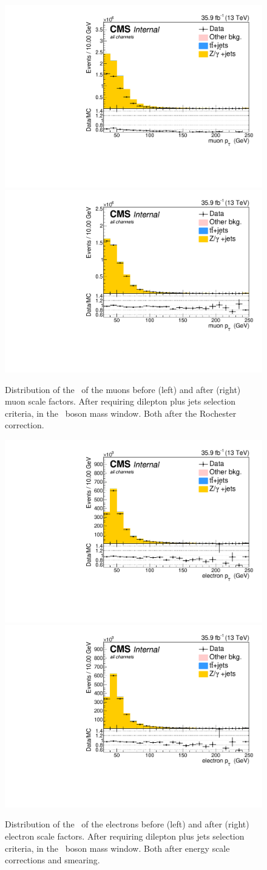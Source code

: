 \begin{figure}[htbp]
	\centering
	\includegraphics[width=0.49\linewidth]{5_Eventselection/Figures/Reweighing/2lepcontrol_dilep_MuPt_all_Stackbefore}
	\includegraphics[width=0.49\linewidth]{5_Eventselection/Figures/Reweighing/2lepcontrol_dilep_MuPt_all_Stack}
	\caption{Distribution of the \pt\ of the muons before (left) and after (right) muon scale factors. After requiring dilepton plus jets selection criteria, in the \PZ\ boson mass window. Both after the Rochester correction.}
	\label{fig:muSF}
\end{figure}
\begin{figure}[htbp]
	\centering
	\includegraphics[width=0.49\linewidth]{5_Eventselection/Figures/Reweighing/2lepcontrol_dilep_ElPt_all_Stackbefore}
	\includegraphics[width=0.49\linewidth]{5_Eventselection/Figures/Reweighing/2lepcontrol_dilep_ElPt_all_Stack}
	\caption{Distribution of the \pt\ of the electrons before (left) and after (right) electron scale factors. After requiring dilepton plus jets selection criteria, in the \PZ\ boson mass window. Both after energy scale corrections and smearing.}
	\label{fig:elSF}
\end{figure}

